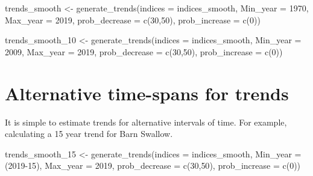 \documentclass[
]{book}
\newenvironment{Shaded}{\begin{snugshade}}{\end{snugshade}}
\newcommand{\AttributeTok}[1]{\textcolor[rgb]{0.77,0.63,0.00}{#1}}
\newcommand{\DecValTok}[1]{\textcolor[rgb]{0.00,0.00,0.81}{#1}}
\newcommand{\FunctionTok}[1]{\textcolor[rgb]{0.00,0.00,0.00}{#1}}
\newcommand{\NormalTok}[1]{#1}
\newcommand{\OtherTok}[1]{\textcolor[rgb]{0.56,0.35,0.01}{#1}}
\begin{document}
\begin{Shaded}
\begin{Highlighting}[]
\NormalTok{trends\_smooth }\OtherTok{\textless{}{-}} \FunctionTok{generate\_trends}\NormalTok{(}\AttributeTok{indices =}\NormalTok{ indices\_smooth,}
                          \AttributeTok{Min\_year =} \DecValTok{1970}\NormalTok{,}
                          \AttributeTok{Max\_year =} \DecValTok{2019}\NormalTok{,}
                          \AttributeTok{prob\_decrease =} \FunctionTok{c}\NormalTok{(}\DecValTok{30}\NormalTok{,}\DecValTok{50}\NormalTok{),}
                          \AttributeTok{prob\_increase =} \FunctionTok{c}\NormalTok{(}\DecValTok{0}\NormalTok{))}

\NormalTok{trends\_smooth\_10 }\OtherTok{\textless{}{-}} \FunctionTok{generate\_trends}\NormalTok{(}\AttributeTok{indices =}\NormalTok{ indices\_smooth,}
                          \AttributeTok{Min\_year =} \DecValTok{2009}\NormalTok{,}
                          \AttributeTok{Max\_year =} \DecValTok{2019}\NormalTok{,}
                          \AttributeTok{prob\_decrease =} \FunctionTok{c}\NormalTok{(}\DecValTok{30}\NormalTok{,}\DecValTok{50}\NormalTok{),}
                          \AttributeTok{prob\_increase =} \FunctionTok{c}\NormalTok{(}\DecValTok{0}\NormalTok{))}
\end{Highlighting}
\end{Shaded}

\hypertarget{alternative-time-spans-for-trends}{%
\section{Alternative time-spans for trends}\label{alternative-time-spans-for-trends}}

It is simple to estimate trends for alternative intervals of time. For example, calculating a 15 year trend for Barn Swallow.

\begin{Shaded}
\begin{Highlighting}[]
\NormalTok{trends\_smooth\_15 }\OtherTok{\textless{}{-}} \FunctionTok{generate\_trends}\NormalTok{(}\AttributeTok{indices =}\NormalTok{ indices\_smooth,}
                          \AttributeTok{Min\_year =}\NormalTok{ (}\DecValTok{2019{-}15}\NormalTok{),}
                          \AttributeTok{Max\_year =} \DecValTok{2019}\NormalTok{,}
                          \AttributeTok{prob\_decrease =} \FunctionTok{c}\NormalTok{(}\DecValTok{30}\NormalTok{,}\DecValTok{50}\NormalTok{),}
                          \AttributeTok{prob\_increase =} \FunctionTok{c}\NormalTok{(}\DecValTok{0}\NormalTok{)) }
\end{Highlighting}
\end{Shaded}
\end{document}
